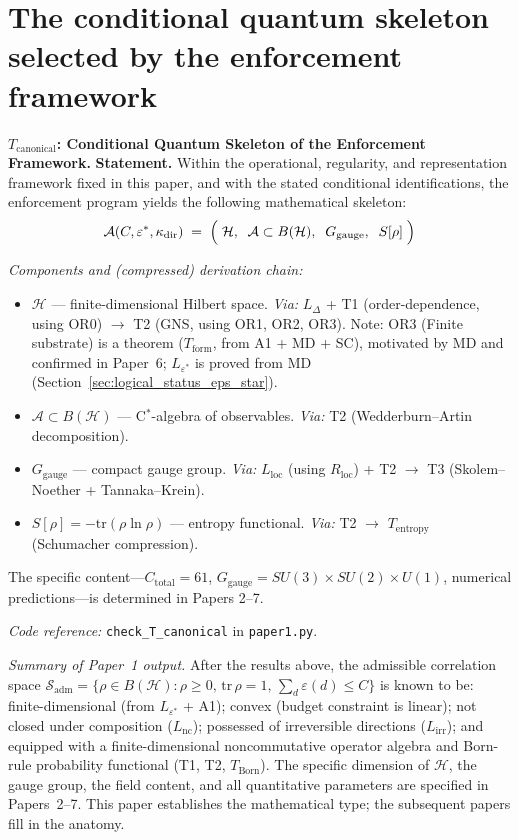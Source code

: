 \documentclass[11pt]{article}
\theoremstyle{remark}
\newenvironment{varlist}{\begin{itemize}[nosep,leftmargin=2em]}{\end{itemize}}
\newcommand{\coderef}[2]{\smallskip\noindent\textit{Code reference:} \texttt{#1} in \texttt{#2}.}
\begin{document}
\section{The conditional quantum skeleton selected by the enforcement framework}
\label{sec:conditional}


\medskip\noindent\textbf{$T_{\mathrm{canonical}}$: Conditional Quantum Skeleton of the Enforcement Framework.}
\textbf{Statement.}  Within the operational, regularity, and representation
framework fixed in this paper, and with the stated conditional identifications,
the enforcement program yields the following mathematical skeleton:
\begin{equation}
\mathcal{A}(C, \varepsilon^*, \kappa_{\mathrm{dir}}) \;=\; \Bigl(\;\mathcal{H},\;\; \mathcal{A} \subset B(\mathcal{H}),\;\; G_{\mathrm{gauge}},\;\; S[\rho]\;\Bigr)
\end{equation}

\smallskip\noindent\textit{Components and (compressed) derivation chain:}
\begin{varlist}
\item $\mathcal{H}$ --- finite-dimensional Hilbert space. \textit{Via:} $L_\Delta$ + T1 (order-dependence, using OR0) $\to$ T2 (GNS, using OR1, OR2, OR3). Note: OR3 (Finite substrate) is a theorem ($T_{\mathrm{form}}$, from A1 + MD + SC), motivated by MD and confirmed in Paper~6; $L_{\varepsilon^*}$ is proved from MD (Section~\ref{sec:logical_status_eps_star}).
\item $\mathcal{A} \subset B(\mathcal{H})$ --- C$^*$-algebra of observables. \textit{Via:} T2 (Wedderburn--Artin decomposition).
\item $G_{\mathrm{gauge}}$ --- compact gauge group. \textit{Via:} $L_{\mathrm{loc}}$ (using $R_{\mathrm{loc}}$) + T2 $\to$ T3 (Skolem--Noether + Tannaka--Krein).
\item $S[\rho] = -\mathrm{tr}(\rho \ln \rho)$ --- entropy functional. \textit{Via:} T2 $\to$ $T_{\mathrm{entropy}}$ (Schumacher compression).
\end{varlist}

\smallskip
The specific content---$C_{\mathrm{total}} = 61$, $G_{\mathrm{gauge}} = SU(3) \times SU(2) \times U(1)$, numerical predictions---is determined in Papers 2--7.

\coderef{check\_T\_canonical}{paper1.py}


\smallskip\noindent\textit{Summary of Paper~1 output.}  After the results above, the admissible correlation space $\mathcal{S}_{\mathrm{adm}} = \{\rho \in B(\mathcal{H}) : \rho \ge 0,\, \mathrm{tr}\,\rho = 1,\, \sum_d \varepsilon(d) \le C\}$ is known to be: finite-dimensional (from $L_{\varepsilon^*}$ + A1); convex (budget constraint is linear); not closed under composition ($L_{\mathrm{nc}}$); possessed of irreversible directions ($L_{\mathrm{irr}}$); and equipped with a finite-dimensional noncommutative operator algebra and Born-rule probability functional (T1, T2, $T_{\mathrm{Born}}$).  The specific dimension of $\mathcal{H}$, the gauge group, the field content, and all quantitative parameters are specified in Papers~2--7.  This paper establishes the mathematical type; the subsequent papers fill in the anatomy.
\end{document}
